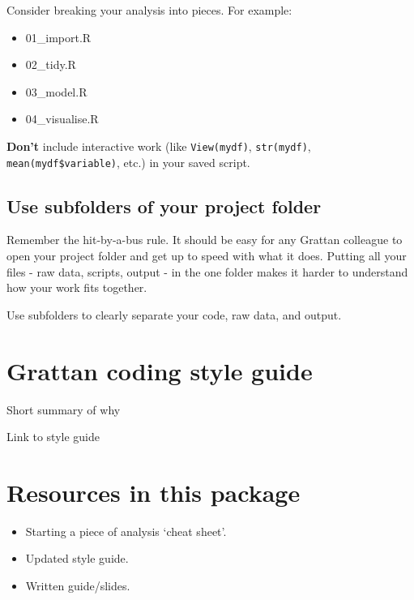 \documentclass[]{book}
\providecommand{\tightlist}{%
  \setlength{\itemsep}{0pt}\setlength{\parskip}{0pt}}
\begin{document}
Consider breaking your analysis into pieces. For example:

\begin{itemize}
\tightlist
\item
  01\_import.R
\item
  02\_tidy.R
\item
  03\_model.R
\item
  04\_visualise.R
\end{itemize}

\textbf{Don't} include interactive work (like \texttt{View(mydf)}, \texttt{str(mydf)}, \texttt{mean(mydf\$variable)}, etc.) in your saved script.

\hypertarget{use-subfolders-of-your-project-folder}{%
\subsection{Use subfolders of your project folder}\label{use-subfolders-of-your-project-folder}}

Remember the hit-by-a-bus rule. It should be easy for any Grattan colleague to open your project folder and get up to speed with what it does. Putting all your files - raw data, scripts, output - in the one folder makes it harder to understand how your work fits together.

Use subfolders to clearly separate your code, raw data, and output.

\hypertarget{grattan-coding-style-guide}{%
\section{Grattan coding style guide}\label{grattan-coding-style-guide}}

Short summary of why

Link to style guide

\hypertarget{resources-in-this-package}{%
\section{Resources in this package}\label{resources-in-this-package}}

\begin{itemize}
\tightlist
\item
  Starting a piece of analysis `cheat sheet'.
\item
  Updated style guide.
\item
  Written guide/slides.
\end{itemize}
\end{document}
